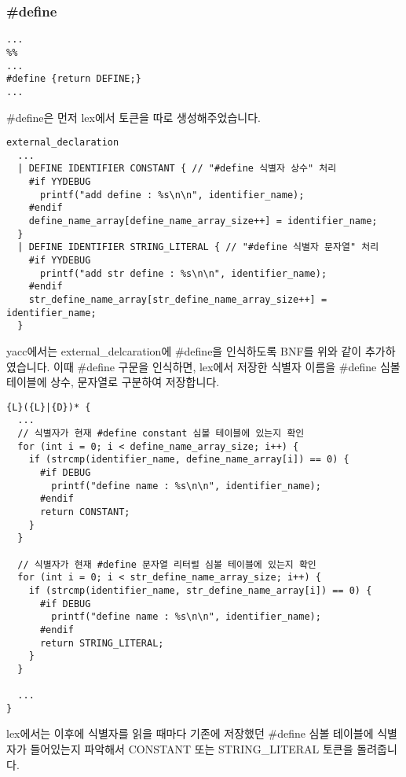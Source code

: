 \documentclass{article}
\begin{document}
\subsubsection{\#define}
\begin{verbatim}
...
%%
...
#define {return DEFINE;}
...
\end{verbatim}
\quad\#define은 먼저 lex에서 토큰을 따로 생성해주었습니다.

\begin{verbatim}
external_declaration
  ...
  | DEFINE IDENTIFIER CONSTANT { // "#define 식별자 상수" 처리
    #if YYDEBUG
      printf("add define : %s\n\n", identifier_name);
    #endif
    define_name_array[define_name_array_size++] = identifier_name;
  }
  | DEFINE IDENTIFIER STRING_LITERAL { // "#define 식별자 문자열" 처리
    #if YYDEBUG
      printf("add str define : %s\n\n", identifier_name);
    #endif
    str_define_name_array[str_define_name_array_size++] = identifier_name;
  }
\end{verbatim}
\quad yacc에서는 external\_delcaration에 \#define을 인식하도록 BNF를 위와 같이 추가하였습니다.
이때 \#define 구문을 인식하면, lex에서 저장한 식별자 이름을 \#define 심볼 테이블에 상수, 문자열로 구분하여 저장합니다.

\begin{verbatim}
{L}({L}|{D})* {
  ...
  // 식별자가 현재 #define constant 심볼 테이블에 있는지 확인
  for (int i = 0; i < define_name_array_size; i++) {
    if (strcmp(identifier_name, define_name_array[i]) == 0) {
      #if DEBUG
        printf("define name : %s\n\n", identifier_name);
      #endif
      return CONSTANT;
    }
  }

  // 식별자가 현재 #define 문자열 리터럴 심볼 테이블에 있는지 확인
  for (int i = 0; i < str_define_name_array_size; i++) {
    if (strcmp(identifier_name, str_define_name_array[i]) == 0) {
      #if DEBUG
        printf("define name : %s\n\n", identifier_name);
      #endif
      return STRING_LITERAL;
    }
  }

  ...
} 
\end{verbatim}
\quad lex에서는 이후에 식별자를 읽을 때마다 기존에 저장했던 \#define 심볼 테이블에 식별자가 들어있는지 파악해서 CONSTANT 또는 STRING\_LITERAL 토큰을 돌려줍니다.
\end{document}
